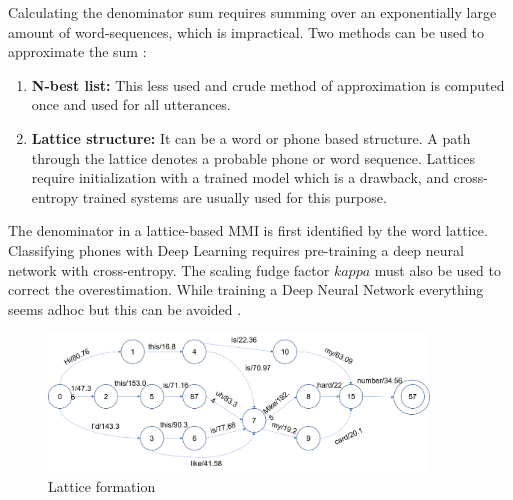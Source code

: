 Calculating the denominator sum requires summing over an exponentially large amount of word-sequences, which is impractical. Two methods can be used to approximate the sum \cite{noauthor_lattice_nodate}:

\begin{enumerate}
    \item \textbf{N-best list:} This less used and crude method of approximation is computed once and used for all utterances. 
    \item \textbf{Lattice structure:} It can be a word or phone based structure. A path through the lattice denotes a probable phone or word sequence. Lattices require initialization with a trained model which is a drawback, and cross-entropy trained systems are usually used for this purpose. 
\end{enumerate}


The denominator in a lattice-based MMI is first identified by the word lattice. Classifying phones with Deep Learning requires pre-training a deep neural network with cross-entropy. The scaling fudge factor $kappa$ must also be used to correct the overestimation. While training a Deep Neural Network everything seems adhoc but this can be avoided \cite{wiesner_lattice_2020}.


\begin{figure}[h]
    \centering
    \includegraphics[width=0.9\textwidth]{img/LatticsMMI.png}
    \caption{Lattice formation}
    \label{fig:Lattice formation}
\end{figure}

